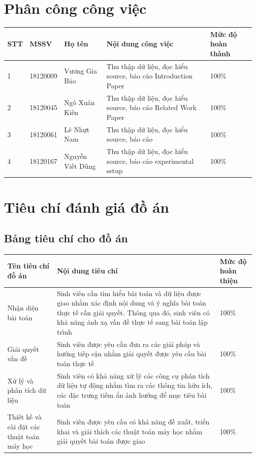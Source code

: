 \documentclass{article}
\newcommand\T{\rule{0pt}{2.6ex}}       %
\newcommand\B{\rule[-1.2ex]{0pt}{0pt}} %
\begin{document}
	\section{Phân công công việc}
	\begin{table}[H]
		\begin{tabular}{ | l | l | l | p{5.5cm} | p{3cm} |}
			\hline
			STT & MSSV & Họ tên & Nội dung công việc & Mức độ hoàn thành  \\ \hline
			1 & 18120009 & Vương Gia Bảo & Thu thập dữ liệu, đọc hiểu source, báo cáo Introduction Paper &  100\%\T\B\\ \hline
			2 & 18120045 & Ngô Xuân Kiên & Thu thập dữ liệu, đọc hiểu source, báo cáo Related Work Paper & 100\%\T\B \\ \hline
			3 & 18120061 & Lê Nhựt Nam & Thu thập dữ liệu, đọc hiểu source, báo cáo & 100\%\T\B \\ \hline
			4 & 18120167 & Nguyễn Viết Dũng &  Thu thập dữ liệu, đọc hiểu source, báo cáo experimental setup & 100\%\T\B \\ \hline
		\end{tabular}
	\end{table}
	\section{Tiêu chí đánh giá đồ án}
	\subsection{Bảng tiêu chí cho đồ án}
	\begin{table}[H]
		\begin{tabular}{ | p{5cm} | p{6.25cm} | p{3cm} |}\hline
			Tên tiêu chí đồ án & Nội dung tiêu chí & Mức độ hoàn thiện  \T\B\\\hline
			Nhận diện bài toán & Sinh viên cần tìm hiểu bài toán và dữ liệu được giao
			nhằm xác định nội dung và ý nghĩa bài toán thực tế cần giải quyết. Thông
			qua đó, sinh viên có khả năng ánh xạ vấn đề thực tế sang bài toán lập trình & 100\%  \T\B\\\hline
			Giải quyết vấn đề & Sinh viên được yêu cầu đưa ra các giải pháp và hướng
			tiếp cận nhằm giải quyết được yêu cầu bài toán thực tế & 100\%  \T\B\\\hline
			Xử lý và phân tích dữ liệu & Sinh viên có khả năng xử lý các công cụ phân
			tích dữ liệu tự động nhằm tìm ra các thông tin hữu ích, các đặc trưng tiềm ẩn
			ảnh hưởng để mục tiêu bài toán &100\%  \T\B\\\hline
			Thiết kế và cài đặt các thuật toán máy học & Sinh viên được yêu cầu có
			khả năng đề xuất, triển khai và giải thích các thuật toán máy học nhằm giải
			quyết bài toán được giao & 100\%  \T\B\\\hline
		\end{tabular}
	\end{table}
\end{document}
